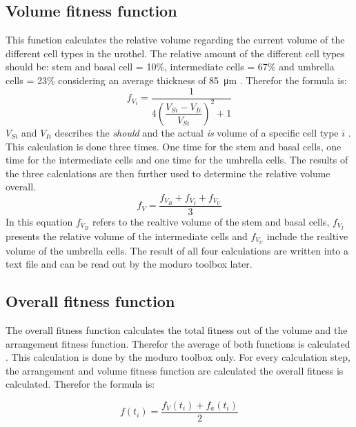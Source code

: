 \subsection{Volume fitness function}
This function calculates the relative volume regarding the current volume of the different cell types in the urothel. The relative amount of the different cell types should be: stem and basal cell = 10\%, intermediate cells = 67\% and umbrella cells = 23\% considering an average thickness of \SI{85}{\micro\metre} \cite{Torelli2017}. Therefor the formula is:
\begin{equation}\label{eq:VolumeFitnessSpecific}
f_{V_{i}} = \dfrac{1}{4 (\dfrac{V_{Si}-V_{Ii}}{V_{Si}})^2 + 1}
\end{equation}
$V_{Si}$ and $V_{Ii}$ describes the \textit{should} and the actual \textit{is} volume of a specific cell type $i$ \cite{Torelli2017}.  This calculation is done three times. One time for the stem and basal cells, one time for the intermediate cells and one time for the umbrella cells. The results of the three calculations are then further used to determine the relative volume overall.
\begin{equation}\label{eq:VolumeFitnessOverall}
f_{V} = \dfrac{f_{V_{B}} + f_{V_{I}} + f_{V_{U}}}{3}
\end{equation}
In this equation $f_{V_{B}}$ refers to the realtive volume of the stem and basal cells, $f_{V_{I}}$ presents the relative volume of the intermediate cells and $f_{V_{U}}$ include the realtive volume of the umbrella cells. \newline
The result of all four calculations are written into a text file and can be read out by the moduro toolbox later.

\subsection{Overall fitness function}
The overall fitness function calculates the total fitness out of the volume and the arrangement fitness function. Therefor the average of both functions is calculated \cite{Torelli2017}. This calculation is done by the moduro toolbox only. For every calculation step, the arrangement and volume fitness function are calculated the overall fitness is calculated. Therefor the formula is:

\begin{equation} 
f(t_{i}) = \dfrac{f_{V}(t_{i})+f_{a}(t_{i})}{2}
\end{equation}

